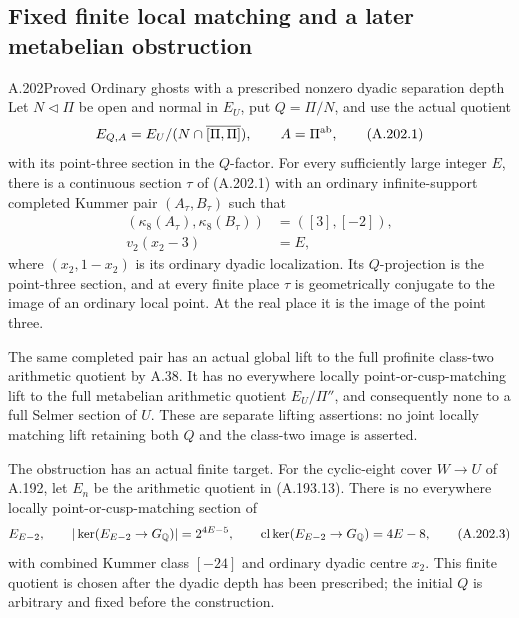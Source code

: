 \subsection{Fixed finite local matching and a later metabelian obstruction}

\begin{statement}{A.202}{Proved}
{Ordinary ghosts with a prescribed nonzero dyadic separation depth}
Let \(N\triangleleft\Pi\) be open and normal in \(E_U\), put
\(Q=\Pi/N\), and use the actual quotient
\[
 E_{Q,A}=E_U/(N\cap\overline{[\Pi,\Pi]}),
 \qquad A=\Pi^{\rm ab},
\tag{A.202.1}
\]
with its point-three section in the \(Q\)-factor.
For every sufficiently large integer \(E\), there is a continuous
section \(\tau\) of (A.202.1) with an ordinary infinite-support
completed Kummer pair \((A_\tau,B_\tau)\) such that
\[
 \begin{aligned}
 (\kappa_8(A_\tau),\kappa_8(B_\tau))&=([3],[-2]),\\
 v_2(x_2-3)&=E,
 \end{aligned}
\tag{A.202.2}
\]
where \((x_2,1-x_2)\) is its ordinary dyadic localization.
Its \(Q\)-projection is the point-three section, and at every
finite place \(\tau\) is geometrically conjugate to the image
of an ordinary local point.  At the real place it is the image
of the point three.

The same completed pair has an actual global lift to the full
profinite class-two arithmetic quotient by A.38.  It has no
everywhere locally point-or-cusp-matching lift to the full
metabelian arithmetic quotient \(E_U/\Pi''\), and consequently
none to a full Selmer section of \(U\).
These are separate lifting assertions: no joint locally matching
lift retaining both \(Q\) and the class-two image is asserted.

The obstruction has an actual finite target.  For the cyclic-eight
cover \(W\to U\) of A.192, let \(E_n\) be the arithmetic
quotient in (A.193.13).  There is no everywhere locally
point-or-cusp-matching section of
\[
 E_{E-2},\qquad
 |\ker(E_{E-2}\to G_\mathbb Q)|=2^{4E-5},\qquad
 \operatorname{cl}\ker(E_{E-2}\to G_\mathbb Q)=4E-8,
\tag{A.202.3}
\]
with combined Kummer class \([-24]\) and ordinary dyadic
centre \(x_2\).  This finite quotient is chosen after the
dyadic depth has been prescribed; the initial \(Q\) is arbitrary
and fixed before the construction.
\end{statement}

